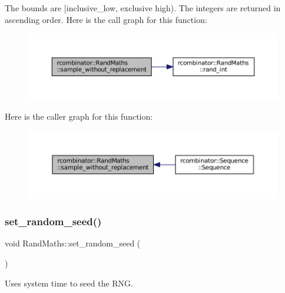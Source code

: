 The bounds are \mbox{[}inclusive\+\_\+low, exclusive high). The integers are returned in ascending order. Here is the call graph for this function\+:
\nopagebreak
\begin{figure}[H]
\begin{center}
\leavevmode
\includegraphics[width=350pt]{classrcombinator_1_1RandMaths_a2c31949c9ac03952cb0006e6a88e3d85_cgraph}
\end{center}
\end{figure}
Here is the caller graph for this function\+:
\nopagebreak
\begin{figure}[H]
\begin{center}
\leavevmode
\includegraphics[width=350pt]{classrcombinator_1_1RandMaths_a2c31949c9ac03952cb0006e6a88e3d85_icgraph}
\end{center}
\end{figure}
\mbox{\label{classrcombinator_1_1RandMaths_a2b61e31de6067ffa35531d5bde40f4c6}} 
\subsubsection{\texorpdfstring{set\+\_\+random\+\_\+seed()}{set\_random\_seed()}}
{\footnotesize\ttfamily void Rand\+Maths\+::set\+\_\+random\+\_\+seed (\begin{DoxyParamCaption}{ }\end{DoxyParamCaption})}



Uses system time to seed the R\+NG. 

